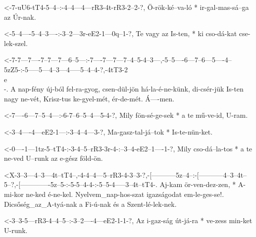   {<-7-uU6-tT4-5--4--:-4--4---4---rR3-4t-rR3-2--2-?,}
  {  Ö-rök-ké--va-ló * ir-gal-mas-sá--ga az  Úr-nak.}

  {<-5--4----5--4--3----:-3--2---3r-eE2-1---0q--1-?,}
  {  Te vagy az Is-ten, * ki cso-dá-kat cse-lek-szel.}


  {<-7-7---7----7--7---7---6--5---:-7----7---7---7--4--5-4--3---,-5--5----6---7--6---5----4--5zZ5-:-5-----5---4--3---4-----5--4--4-?,-4tT3-2\\e\\-.}
  {  A nap-fény új-ból fel-ra-gyog, csen-dül-jön há-la-é-ne-künk, di-csér-jük Is-ten nagy ne-vét,   Krisz-tus ke-gyel-mét, ér-de-mét. Á----men.}

  {<-7----6---7--5--4---:-6-7--6--5--4---5-4-?,}
  {  Mily fön-sé-ge-sek * a te mű-ve-id, U-ram.}

  {<-3--4----4---eE2-1---:-3--4--4---3-?,}
  {  Ma-gasz-tal-já--tok * Is-te-nün-ket.}

  {<-0----1---1tz-5--tT4-:-3-4--5--rR3-3r-4-:--3--4-eE2--1----1-?,}
  {  Mily cso-dá--la-tos * a te ne-ved U--runk az e-gész föld-ön.}

  {<X-3--3---4--3---4t--tT4--,-4-4--4---5--rR3-4-3--3-?,-[-----------5z--4--:-[-----------4--3--4t--5--?,-[-------------5z--5-:-5-5--4-4-:-5--5-4-----3--4t--tT4-.}
  {   Aj-kam ör-ven-dez-zen, * A-mi-kor ne-ked é-ne-kel. Nyelvem_nap-hos-szat igazságodat em-le-ges-se!. Dicsőség_az_A-tyá-nak a Fi-ú-nak és a Szent-lé-lek-nek.}

  {<-3--3-5---rR3-4--4--5--:-3--2----4---eE2-1-1-?,}
  {  Az i-gaz-ság út-já-ra * ve-zess min-ket U-runk.}

